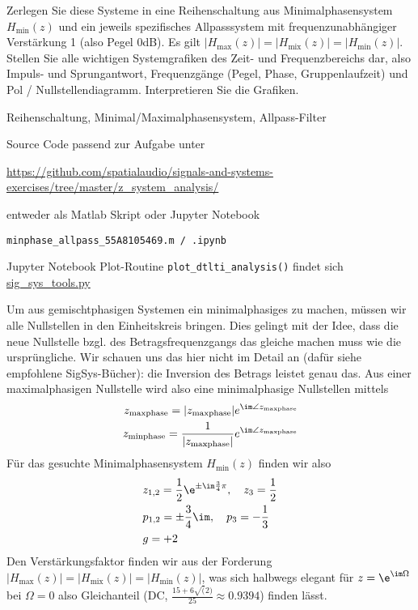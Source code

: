 Zerlegen Sie diese Systeme in eine Reihenschaltung aus Minimalphasensystem
$H_\mathrm{min}(z)$
und ein jeweils spezifisches Allpasssystem mit frequenzunabhängiger
Verstärkung 1 (also Pegel 0dB).
Es gilt $|H_\mathrm{max}(z)| = |H_\mathrm{mix}(z)| = |H_\mathrm{min}(z)|$.
%
Stellen Sie alle wichtigen Systemgrafiken des Zeit- und Frequenzbereichs dar,
also Impuls- und Sprungantwort, Frequenzgänge (Pegel, Phase, Gruppenlaufzeit)
und Pol / Nullstellendiagramm.
%
Interpretieren Sie die Grafiken.



\begin{Werkzeug}
Reihenschaltung, Minimal/Maximalphasensystem, Allpass-Filter

Source Code passend zur Aufgabe unter

\url{https://github.com/spatialaudio/signals-and-systems-exercises/tree/master/z_system_analysis/}

entweder als Matlab Skript oder Jupyter Notebook

\texttt{minphase\_allpass\_55A8105469.m / .ipynb}

Jupyter Notebook Plot-Routine \texttt{plot\_dtlti\_analysis()} findet sich
\url{sig_sys_tools.py}


\end{Werkzeug}
\begin{Ansatz}
Um aus gemischtphasigen Systemen ein minimalphasiges zu machen, müssen wir
alle Nullstellen in den Einheitskreis bringen. Dies gelingt mit der Idee, dass
die neue Nullstelle bzgl. des Betragsfrequenzgangs
das gleiche machen muss wie die ursprüngliche.
Wir schauen uns das hier nicht im Detail an (dafür siehe empfohlene SigSys-Bücher):
die Inversion des Betrags leistet genau das. Aus einer maximalphasigen Nullstelle
wird also eine minimalphasige Nullstellen mittels
\begin{align}
z_\mathrm{maxphase} = |z_\mathrm{maxphase}| e^{\im\angle z_\mathrm{maxphase}}\\
 z_\mathrm{minphase} = \frac{1}{|z_\mathrm{maxphase}|} e^{\im\angle z_\mathrm{maxphase}}
\end{align}
%
Für das gesuchte Minimalphasensystem $H_\mathrm{min}(z)$ finden wir also
\begin{align}
&z_{1,2} = \frac{1}{2} \e^{\pm\im\frac{3}{4}\pi},\quad z_3 = \frac{1}{2}\\
&p_{1,2} = \pm\frac{3}{4}\im,\quad p_3 = -\frac{1}{3}\\
&g = +2
\end{align}
Den Verstärkungsfaktor finden wir aus der Forderung
$|H_\mathrm{max}(z)| = |H_\mathrm{mix}(z)| = |H_\mathrm{min}(z)|$, was
sich halbwegs elegant für $z=\e^{\im \Omega}$ bei $\Omega=0$ also Gleichanteil
(DC, $\frac{15+6\sqrt(2)}{25} \approx 0.9394$) finden lässt.
%
\end{Ansatz}
